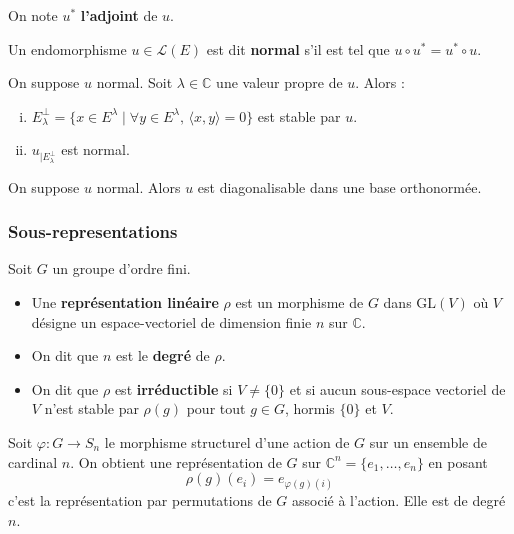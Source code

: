 	
	\begin{notation}
		On note $u^*$ \textbf{l'adjoint} de $u$.
	\end{notation}
	
	\begin{definition}
		Un endomorphisme $u \in \mathcal{L}(E)$ est dit \textbf{normal} s'il est tel que $u \circ u^* = u^* \circ u$.
	\end{definition}
	
	\begin{proposition}
		On suppose $u$ normal. Soit $\lambda \in \mathbb{C}$ une valeur propre de $u$. Alors :
		\begin{enumerate}[(i)]
			\item $E_\lambda^\perp = \{ x \in E^\lambda \mid \forall y \in E^\lambda, \, \langle x, y \rangle = 0 \}$ est stable par $u$.
			\item $u_{| E_\lambda^\perp}$ est normal.
		\end{enumerate}
	\end{proposition}
	
	\begin{corollary}
		On suppose $u$ normal. Alors $u$ est diagonalisable dans une base orthonormée.
	\end{corollary}
	
	\subsubsection{Sous-representations}
	
	
	Soit $G$ un groupe d'ordre fini.
	
	\begin{definition}
		\begin{itemize}
			\item Une \textbf{représentation linéaire} $\rho$ est un morphisme de $G$ dans $\mathrm{GL}(V)$ où $V$ désigne un espace-vectoriel de dimension finie $n$ sur $\mathbb{C}$.
			\item On dit que $n$ est le \textbf{degré} de $\rho$.
			\item On dit que $\rho$ est \textbf{irréductible} si $V \neq \{ 0 \}$ et si aucun sous-espace vectoriel de $V$ n'est stable par $\rho(g)$ pour tout $g \in G$, hormis $\{ 0 \}$ et $V$.
		\end{itemize}
	\end{definition}
	
	\begin{example}
		Soit $\varphi : G \rightarrow S_n$ le morphisme structurel d'une action de $G$ sur un ensemble de cardinal $n$. On obtient une représentation de $G$ sur $\mathbb{C}^n = \{ e_1, \dots, e_n \}$ en posant
		\[ \rho(g)(e_i) = e_{\varphi(g)(i)} \]
		c'est la représentation par permutations de $G$ associé à l'action. Elle est de degré $n$. 
	\end{example}
	
